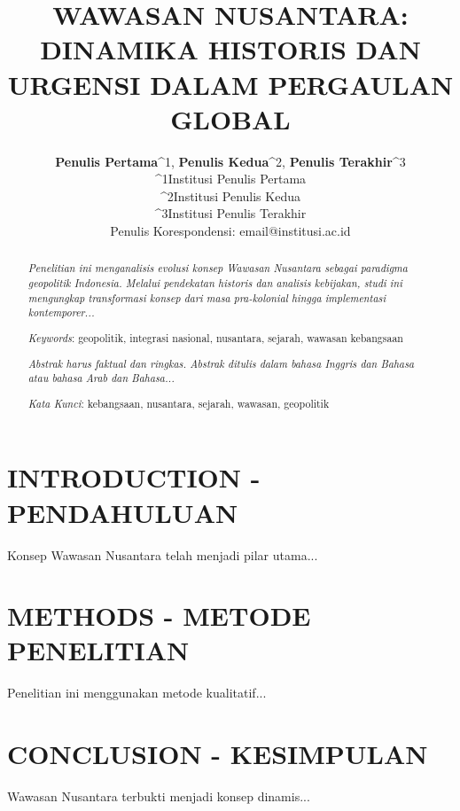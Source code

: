 \documentclass[a4paper,12pt]{article}
\title{\fontsize{16}{19}\selectfont\bfseries WAWASAN NUSANTARA: DINAMIKA HISTORIS DAN URGENSI DALAM PERGAULAN GLOBAL}
\author{
  \fontsize{11}{13}\selectfont\textbf{Penulis Pertama}^1, 
  \fontsize{11}{13}\selectfont\textbf{Penulis Kedua}^2, 
  \fontsize{11}{13}\selectfont\textbf{Penulis Terakhir}^3 \\
  ^1\fontsize{10}{12}\selectfont Institusi Penulis Pertama \\
  ^2\fontsize{10}{12}\selectfont Institusi Penulis Kedua \\
  ^3\fontsize{10}{12}\selectfont Institusi Penulis Terakhir \\
  \fontsize{10}{12}\selectfont Penulis Korespondensi: email@institusi.ac.id
}
\begin{document}
\maketitle

\begin{abstract}
\fontsize{10}{12}\selectfont\itshape
Penelitian ini menganalisis evolusi konsep Wawasan Nusantara sebagai paradigma geopolitik Indonesia. Melalui pendekatan historis dan analisis kebijakan, studi ini mengungkap transformasi konsep dari masa pra-kolonial hingga implementasi kontemporer...

\textit{Keywords}: geopolitik, integrasi nasional, nusantara, sejarah, wawasan kebangsaan
\end{abstract}

\begin{abstract}
\fontsize{10}{12}\selectfont\itshape
Abstrak harus faktual dan ringkas. Abstrak ditulis dalam bahasa Inggris dan Bahasa atau bahasa Arab dan Bahasa...

\textit{Kata Kunci}: kebangsaan, nusantara, sejarah, wawasan, geopolitik
\end{abstract}

\section{INTRODUCTION - PENDAHULUAN}
Konsep Wawasan Nusantara telah menjadi pilar utama... \cite{Soemarwoto2005}

\section{METHODS - METODE PENELITIAN}
Penelitian ini menggunakan metode kualitatif... \cite{Bappenas2023}


\section{CONCLUSION - KESIMPULAN}
Wawasan Nusantara terbukti menjadi konsep dinamis...



\end{document}
